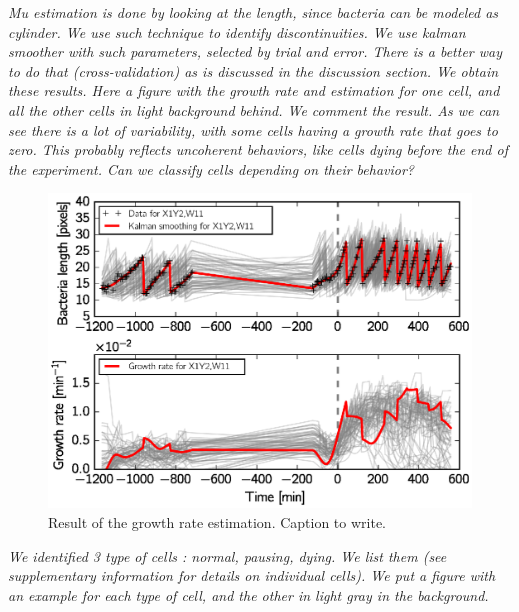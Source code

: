 \textit{
Mu estimation is done by looking at the length, since bacteria can be modeled as cylinder.
We use such technique to identify discontinuities.
We use kalman smoother with such parameters, selected by trial and error.
There is a better way to do that (cross-validation) as is discussed in the discussion section.
We obtain these results.
Here a figure with the growth rate and estimation for one cell, and all the other cells in light background behind.
We comment the result.
As we can see there is a lot of variability, with some cells having a growth rate that goes to zero.
This probably reflects uncoherent behaviors, like cells dying before the end of the experiment.
Can we classify cells depending on their behavior?
}

\begin{figure}[h!]
\centering
\includegraphics[scale=1]{./Fig/growth_rate_estimation}
\caption{Result of the growth rate estimation. Caption to write.}
\label{fig:growth_rate_estimation}
\end{figure}

\textit{
We identified 3 type of cells : normal, pausing, dying.
We list them (see supplementary information for details on individual cells).
We put a figure with an example for each type of cell, and the other in light gray in the background.
}

